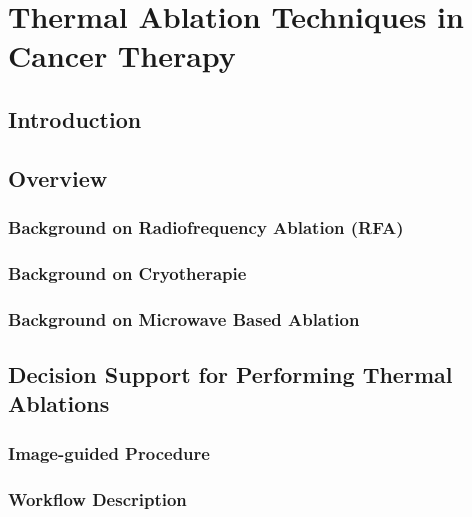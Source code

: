 \chapter{Thermal Ablation Techniques in Cancer Therapy}
\section{Introduction}
\section{Overview}
\subsection{Background on Radiofrequency Ablation (RFA)}
\subsection{Background on Cryotherapie}
\subsection{Background on Microwave Based Ablation}
\section{Decision Support for Performing Thermal Ablations}
\subsection{Image-guided Procedure}
\subsection{Workflow Description}
